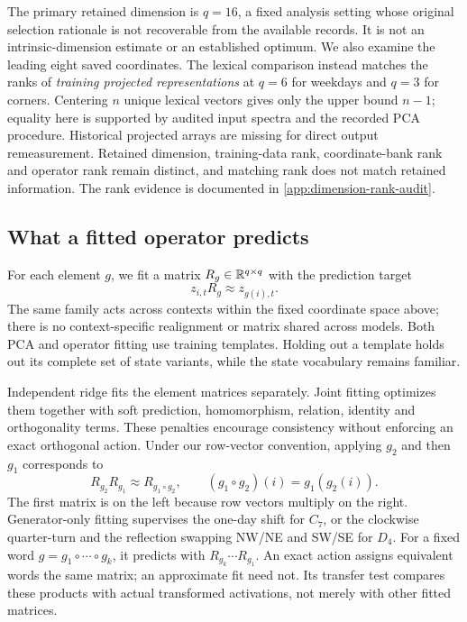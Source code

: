 The primary retained dimension is $q=16$, a fixed analysis setting whose original selection rationale is not recoverable from the available records. It is not an intrinsic-dimension estimate or an established optimum. We also examine the leading eight saved coordinates. The lexical comparison instead matches the ranks of \emph{training projected representations} at $q=6$ for weekdays and $q=3$ for corners. Centering $n$ unique lexical vectors gives only the upper bound $n-1$; equality here is supported by audited input spectra and the recorded PCA procedure. Historical projected arrays are missing for direct output remeasurement. Retained dimension, training-data rank, coordinate-bank rank and operator rank remain distinct, and matching rank does not match retained information. The rank evidence is documented in \cref{app:dimension-rank-audit}.

\subsection{What a fitted operator predicts}
For each element $g$, we fit a matrix $R_g\in\mathbb{R}^{q\times q}$ with the prediction target
\begin{equation}
 z_{i,t}R_g\approx z_{g(i),t}.
 \label{eq:prediction}
\end{equation}
The same family acts across contexts within the fixed coordinate space above; there is no context-specific realignment or matrix shared across models. Both PCA and operator fitting use training templates. Holding out a template holds out its complete set of state variants, while the state vocabulary remains familiar.

Independent ridge fits the element matrices separately. Joint fitting optimizes them together with soft prediction, homomorphism, relation, identity and orthogonality terms. These penalties encourage consistency without enforcing an exact orthogonal action. Under our row-vector convention, applying $g_2$ and then $g_1$ corresponds to
\begin{equation}
 R_{g_2}R_{g_1}\approx R_{g_1\circ g_2},
 \qquad (g_1\circ g_2)(i)=g_1(g_2(i)).
 \label{eq:convention}
\end{equation}
The first matrix is on the left because row vectors multiply on the right. Generator-only fitting supervises the one-day shift for $C_7$, or the clockwise quarter-turn and the reflection swapping NW/NE and SW/SE for $D_4$. For a fixed word $g=g_1\circ\cdots\circ g_k$, it predicts with $R_{g_k}\cdots R_{g_1}$. An exact action assigns equivalent words the same matrix; an approximate fit need not. Its transfer test compares these products with actual transformed activations, not merely with other fitted matrices.

